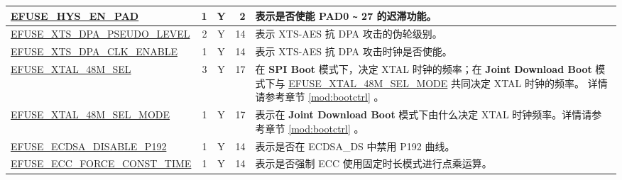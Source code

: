 \begin{longtable}[l]{ |m{8.2cm}|r|c|r|m{9.3cm}| }
    \hline
    \hyperref[fielddesc:EFUSEHYSENPAD]{EFUSE\_HYS\_EN\_PAD} & 1 & Y & 2 & 表示是否使能 PAD0 \verb+~+ 27 的迟滞功能。\\
    \hline
    \hyperref[fielddesc:EFUSEXTSDPAPSEUDOLEVEL]{EFUSE\_XTS\_DPA\_PSEUDO\_LEVEL} & 2 & Y & 14 & 表示 XTS-AES 抗 DPA 攻击的伪轮级别。\\
    \hline
    \hyperref[fielddesc:EFUSEXTSDPACLKENABLE]{EFUSE\_XTS\_DPA\_CLK\_ENABLE} & 1 & Y & 14 & 表示 XTS-AES 抗 DPA 攻击时钟是否使能。\\
    \hline
    \hyperref[fielddesc:EFUSEXTAL48MSEL]{EFUSE\_XTAL\_48M\_SEL} &  3 & Y & 17 & 在 \textbf{SPI Boot} 模式下，决定 XTAL 时钟的频率；在 \textbf{Joint Download Boot} 模式下与 \hyperref[fielddesc:EFUSEXTAL48MSELMODE]{EFUSE\_XTAL\_48M\_SEL\_MODE} 共同决定 XTAL 时钟的频率。 详情请参考章节 \ref{mod:bootctrl} \textit{\nameref{mod:bootctrl}}。\\
    \hline
    \hyperref[fielddesc:EFUSEXTAL48MSELMODE]{EFUSE\_XTAL\_48M\_SEL\_MODE} &  1 & Y & 17 & 表示在 \textbf{Joint Download Boot} 模式下由什么决定 XTAL 时钟频率。详情请参考章节 \ref{mod:bootctrl} \textit{\nameref{mod:bootctrl}}。\\
    \hline
    \hyperref[fielddesc:EFUSEECDSADISABLEP192]{EFUSE\_ECDSA\_DISABLE\_P192} &  1 & Y & 14 & 表示是否在 ECDSA\_DS 中禁用 P192 曲线。\\
    \hline
    \hyperref[fielddesc:EFUSEECCFORCECONSTTIME]{EFUSE\_ECC\_FORCE\_CONST\_TIME} &  1 & Y & 14 & 表示是否强制 ECC 使用固定时长模式进行点乘运算。\\
    \hline
\end{longtable}
